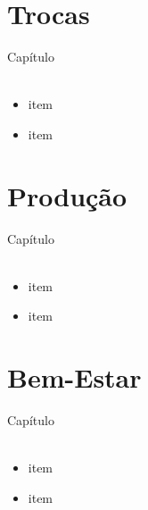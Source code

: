 \documentclass{beamer}[10]
\begin{document}
\section[Trocas]{Trocas}
\begin{frame}
	\huge Capítulo \normalsize
	\\~\\
	\begin{itemize}
		\item item
		\item item
	\end{itemize}
\end{frame}


\begin{frame}
	\frametitle{}

	

\end{frame}

\section[Produção]{Produção}
\begin{frame}
	\huge Capítulo \normalsize
	\\~\\
	\begin{itemize}
		\item item
		\item item
	\end{itemize}
\end{frame}


\begin{frame}
	\frametitle{}

	

\end{frame}

\section[Bem-Estar]{Bem-Estar}
\begin{frame}
	\huge Capítulo \normalsize
	\\~\\
	\begin{itemize}
		\item item
		\item item
	\end{itemize}
\end{frame}
\end{document}

